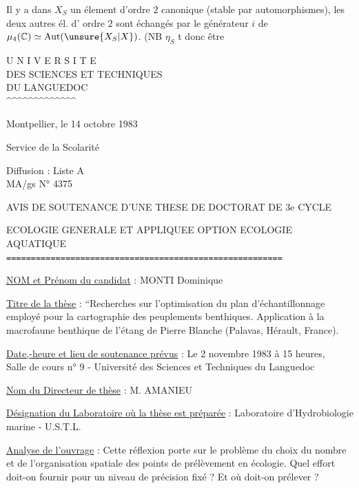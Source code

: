 Il y a dans $X_S$ un élement\raisebox{-.6em}{\unsure{:}} d'ordre $2$ canonique
(stable par automorphismes), les deux autres él. d'
ordre $2$ sont échangés par le générateur $i$ de
$\mu_4(\mathbb C)\simeq\operatorname{Aut}(\unsure{X_S|X})$.
(\leavevmode\hbox{\rlap{\kern.30em\underline{\kern-.30em\phantom{NB}}}NB} $\eta_S$ t donc être 



\begin{center}
U N I V E R S I T E\\
DES SCIENCES ET TECHNIQUES\\
DU LANGUEDOC\\
\textasciicircum\textasciicircum\textasciicircum\textasciicircum\textasciicircum\textasciicircum\textasciicircum\textasciicircum\textasciicircum\textasciicircum\textasciicircum\textasciicircum\textasciicircum
\end{center}

Montpellier, le 14 octobre 1983

Service de la Scolarité

Diffusion : Liste A\\
MA/gs \hfill N° 4375

\begin{center}
AVIS DE SOUTENANCE D'UNE THESE DE DOCTORAT DE 3e CYCLE

ECOLOGIE GENERALE ET APPLIQUEE OPTION ECOLOGIE AQUATIQUE\\
\texttt{========================================================}
\end{center}

\uline{NOM et Prénom du candidat} : MONTI Dominique

\uline{Titre de la thèse} : ``Recherches sur l'optimisation du plan d'échantillonnage employé pour la cartographie des peuplements benthiques. Application à la macrofaune benthique de l'étang de Pierre Blanche (Palavas, Hérault, France).

\uline{Date,-heure et lieu de soutenance prévus} : Le 2 novembre 1983 à 15 heures,\\
Salle de cours n° 9 - Université des Sciences et Techniques du Languedoc

\uline{Nom du Directeur de thèse} : M. AMANIEU

\uline{Désignation du Laboratoire où la thèse est préparée} : Laboratoire d'Hydrobiologie marine - U.S.T.L.

\uline{Analyse de l'ouvrage} : Cette réflexion porte sur le problème du choix du nombre et de l'organisation spatiale des points de prélèvement en écologie. Quel effort doit-on fournir pour un niveau de précision fixé ? Et où doit-on prélever ?

